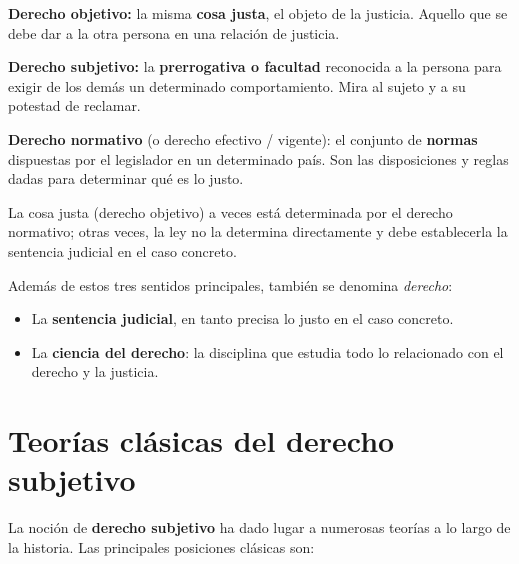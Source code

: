 \documentclass[12pt, a4paper]{report}
\begin{document}
\begin{definition}
\textbf{Derecho objetivo:} la misma \textbf{cosa justa}, el objeto de la
justicia. Aquello que se debe dar a la otra persona en una relación de justicia.
\end{definition}

\begin{definition}
\textbf{Derecho subjetivo:} la \textbf{prerrogativa o facultad} reconocida a la
persona para exigir de los demás un determinado comportamiento. Mira al sujeto
y a su potestad de reclamar.
\end{definition}

\begin{definition}
\textbf{Derecho normativo} (o derecho efectivo / vigente): el conjunto de
\textbf{normas} dispuestas por el legislador en un determinado país. Son las
disposiciones y reglas dadas para determinar qué es lo justo.
\end{definition}

La cosa justa (derecho objetivo) a veces está determinada por el derecho
normativo; otras veces, la ley no la determina directamente y debe establecerla
la sentencia judicial en el caso concreto.

Además de estos tres sentidos principales, también se denomina \textit{derecho}:
\begin{itemize}
  \item La \textbf{sentencia judicial}, en tanto precisa lo justo en el caso
        concreto.
  \item La \textbf{ciencia del derecho}: la disciplina que estudia todo lo
        relacionado con el derecho y la justicia.
\end{itemize}

\section{Teorías clásicas del derecho subjetivo}

La noción de \textbf{derecho subjetivo} ha dado lugar a numerosas teorías a lo
largo de la historia. Las principales posiciones clásicas son:
\end{document}
